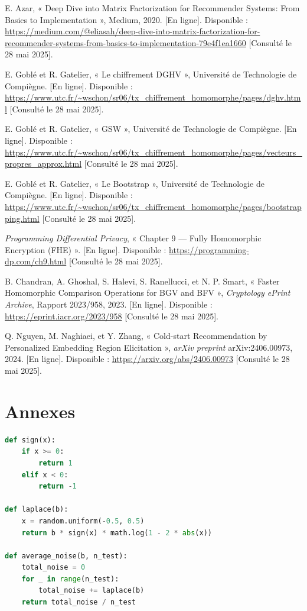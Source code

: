 \documentclass{article}
\begin{document}
\begin{thebibliography}{99}
    E. Azar, « Deep Dive into Matrix Factorization for Recommender Systems: From Basics to Implementation », Medium, 2020. [En ligne]. Disponible : \url{https://medium.com/@eliasah/deep-dive-into-matrix-factorization-for-recommender-systems-from-basics-to-implementation-79e4f1ea1660} [Consulté le 28 mai 2025].

    E. Goblé et R. Gatelier, « Le chiffrement DGHV », Université de Technologie de Compiègne. [En ligne]. Disponible : \url{https://www.utc.fr/~wschon/sr06/tx_chiffrement_homomorphe/pages/dghv.html} [Consulté le 28 mai 2025].

    E. Goblé et R. Gatelier, « GSW », Université de Technologie de Compiègne. [En ligne]. Disponible : \url{https://www.utc.fr/~wschon/sr06/tx_chiffrement_homomorphe/pages/vecteurs_propres_approx.html} [Consulté le 28 mai 2025].

    E. Goblé et R. Gatelier, « Le Bootstrap », Université de Technologie de Compiègne. [En ligne]. Disponible : \url{https://www.utc.fr/~wschon/sr06/tx_chiffrement_homomorphe/pages/bootstrapping.html} [Consulté le 28 mai 2025].

    \emph{Programming Differential Privacy}, « Chapter 9 — Fully Homomorphic Encryption (FHE) ». [En ligne]. Disponible : \url{https://programming-dp.com/ch9.html} [Consulté le 28 mai 2025].

    B. Chandran, A. Ghoshal, S. Halevi, S. Ranellucci, et N. P. Smart, « Faster Homomorphic Comparison Operations for BGV and BFV », \emph{Cryptology ePrint Archive}, Rapport 2023/958, 2023. [En ligne]. Disponible : \url{https://eprint.iacr.org/2023/958} [Consulté le 28 mai 2025].

    Q. Nguyen, M. Naghiaei, et Y. Zhang, « Cold-start Recommendation by Personalized Embedding Region Elicitation », \emph{arXiv preprint} arXiv:2406.00973, 2024. [En ligne]. Disponible : \url{https://arxiv.org/abs/2406.00973} [Consulté le 28 mai 2025].

\end{thebibliography}

\newpage
\section*{Annexes}

\begin{lstlisting}[language=Python, caption={Fonction de génération de bruit Laplacien}, label={lst:laplace}]
def sign(x):
    if x >= 0:
        return 1
    elif x < 0:
        return -1

def laplace(b):
    x = random.uniform(-0.5, 0.5)
    return b * sign(x) * math.log(1 - 2 * abs(x))

def average_noise(b, n_test):
    total_noise = 0
    for _ in range(n_test):
        total_noise += laplace(b)
    return total_noise / n_test 
\end{lstlisting}
\end{document}

